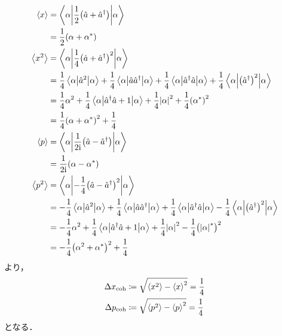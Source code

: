 \documentclass{report}
\begin{document}
    \begin{align}
      \ev{x} &= \mel**{\alpha}{\frac{1}{2}\qty(\hat{a} + \hat{a}^{\dag})}{\alpha} \\ 
      &= \frac{1}{2}\qty(\alpha + \alpha^*) \\ 
      \ev{x^2} &= \mel**{\alpha}{\frac{1}{4}\qty(\hat{a} + \hat{a}^{\dag})^2}{\alpha} \\ 
      &= \frac{1}{4}\mel**{\alpha}{\hat{a}^2}{\alpha} + \frac{1}{4}\mel**{\alpha}{\hat{a}\hat{a}^{\dag}}{\alpha} + \frac{1}{4}\mel**{\alpha}{\hat{a}^{\dag}\hat{a}}{\alpha} + \frac{1}{4}\mel**{\alpha}{\qty(\hat{a}^{\dag})^2}{\alpha} \\ 
      &= \frac{1}{4}\alpha^2 + \frac{1}{4}\mel**{\alpha}{\hat{a}^{\dag}\hat{a} + 1}{\alpha} + \frac{1}{4}\abs{\alpha}^2 + \frac{1}{4}\qty(\alpha^*)^2 \\ 
      &= \frac{1}{4}\qty(\alpha + \alpha^*)^2 + \frac{1}{4} \\ 
      \ev{p} &= \mel**{\alpha}{\frac{1}{2\i}\qty(\hat{a} - \hat{a}^{\dag})}{\alpha} \\ 
      &= \frac{1}{2\i}\qty(\alpha - \alpha^*) \\ 
      \ev{p^2} &= \mel**{\alpha}{-\frac{1}{4}\qty(\hat{a} - \hat{a}^{\dag})^2}{\alpha} \\ 
      &= -\frac{1}{4}\mel**{\alpha}{\hat{a}^2}{\alpha} + \frac{1}{4}\mel**{\alpha}{\hat{a}\hat{a}^{\dag}}{\alpha} + \frac{1}{4}\mel**{\alpha}{\hat{a}^{\dag}\hat{a}}{\alpha} - \frac{1}{4}\mel**{\alpha}{\qty(\hat{a}^{\dag})^2}{\alpha} \\ 
      &= -\frac{1}{4}\alpha^2 + \frac{1}{4}\mel**{\alpha}{\hat{a}^{\dag}\hat{a} + 1}{\alpha} + \frac{1}{4}\abs{\alpha}^2 - \frac{1}{4}\qty(\abs{\alpha}^{*})^2 \\ 
      &= -\frac{1}{4}\qty(\alpha^2 + \alpha^*)^2 + \frac{1}{4}
    \end{align}
    より，
    \begin{align}
      \Delta x_{\r{coh}} &\coloneqq \sqrt{\ev{x^2} - \ev{x}^2} = \frac{1}{4} \\ 
      \Delta p_{\r{coh}} &\coloneqq \sqrt{\ev{p^2} - \ev{p}^2} = \frac{1}{4}
    \end{align}
    となる．
\end{document}
